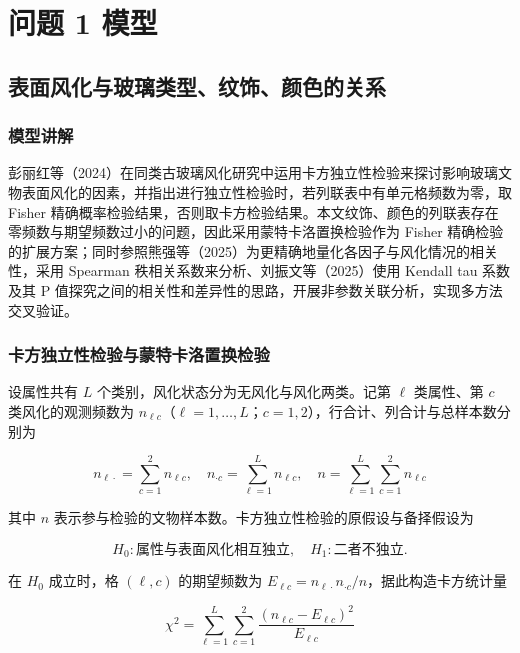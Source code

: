 \documentclass{ctexart}
\begin{document}
\section{问题 1 模型}

\subsection{表面风化与玻璃类型、纹饰、颜色的关系}

\subsubsection{模型讲解}

彭丽红等（2024）在同类古玻璃风化研究中运用卡方独立性检验来探讨影响玻璃文物表面风化的因素，并指出进行独立性检验时，若列联表中有单元格频数为零，取 Fisher 精确概率检验结果，否则取卡方检验结果。本文纹饰、颜色的列联表存在零频数与期望频数过小的问题，因此采用蒙特卡洛置换检验作为 Fisher 精确检验的扩展方案；同时参照熊强等（2025）\cite{xiongqiang2025}为更精确地量化各因子与风化情况的相关性，采用 Spearman 秩相关系数来分析、刘振文等（2025）\cite{liuzhenwen2025}使用 Kendall tau 系数及其 P 值探究之间的相关性和差异性的思路，开展非参数关联分析，实现多方法交叉验证。


\subsubsection{卡方独立性检验与蒙特卡洛置换检验}

设属性共有 $L$ 个类别，风化状态分为无风化与风化两类。记第 $\ell$ 类属性、第 $c$ 类风化的观测频数为 $n_{\ell c}$（$\ell=1,\dots,L$；$c=1,2$），行合计、列合计与总样本数分别为

\begin{equation*}
n_{\ell\cdot}=\sum_{c=1}^{2}n_{\ell c},\quad n_{\cdot c}=\sum_{\ell=1}^{L}n_{\ell c},\quad n=\sum_{\ell=1}^{L}\sum_{c=1}^{2}n_{\ell c}
\end{equation*}

其中 $n$ 表示参与检验的文物样本数。卡方独立性检验的原假设与备择假设为

\begin{equation*}
H_{0}:\text{属性与表面风化相互独立},\quad H_{1}:\text{二者不独立}.
\end{equation*}

在 $H_{0}$ 成立时，格 $(\ell,c)$ 的期望频数为 $E_{\ell c}=n_{\ell\cdot}n_{\cdot c}/n$，据此构造卡方统计量

\begin{equation*}
\chi^{2}=\sum_{\ell=1}^{L}\sum_{c=1}^{2}\frac{(n_{\ell c}-E_{\ell c})^{2}}{E_{\ell c}}
\end{equation*}
\end{document}
